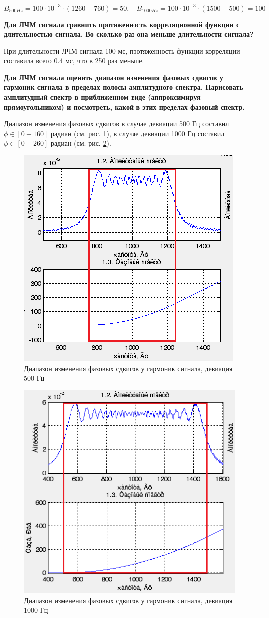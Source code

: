 \begin{equation}
    B_{500Hz} = 100 \cdot 10^{-3} \cdot (1260-760) = 50, \quad B_{1000Hz} = 100 \cdot 10^{-3} \cdot (1500-500) = 100
    \label{eq:}
\end{equation}

\textbf{Для ЛЧМ сигнала сравнить протяженность корреляционной
функции с длительностью сигнала. Во сколько раз она меньше
длительности сигнала?}

При длительности ЛЧМ сигнала 100 мс, протяженность функции корреляции составила всего 0.4 мс, что в 250 раз меньше.

\textbf{Для ЛЧМ сигнала оценить диапазон изменения фазовых сдвигов у
гармоник сигнала в пределах полосы амплитудного спектра.
Нарисовать амплитудный спектр в приближенном виде
(аппроксимируя прямоугольником) и посмотреть, какой в этих
пределах фазовый спектр.}

Диапазон изменения фазовых сдвигов в случае девиации 500 Гц составил $\phi \in [0 - 160]$ радиан (см. рис.
\ref{fig:task3_500_phase}), в случае девиации 1000 Гц составил $\phi \in [0 - 260]$ радиан (см. рис.
\ref{fig:task3_1000_phase}).
\begin{figure}[H]
    \centering
    \includegraphics[width=0.5\linewidth]{imgs/t1s3_500_extra.png}
    \caption{Диапазон изменения фазовых сдвигов у гармоник сигнала, девиация 500 Гц}
    \label{fig:task3_500_phase}
\end{figure}

\begin{figure}[H]
    \centering
    \includegraphics[width=0.5\linewidth]{imgs/t1s3_1000_extra.png}
    \caption{Диапазон изменения фазовых сдвигов у гармоник сигнала, девиация 1000 Гц}
    \label{fig:task3_1000_phase}
\end{figure}

